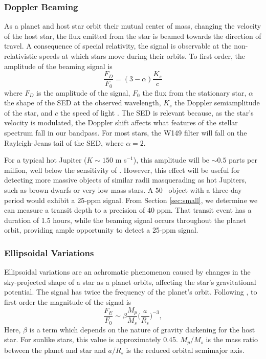 \subsubsection{Doppler Beaming}

As a planet and host star orbit their mutual center of mass, changing the velocity of the
host star, the flux emitted from the star is beamed towards the direction of travel.
A consequence of special relativity, the signal is observable at the non-relativistic
speeds at which stars move during their orbits.
To first order, the amplitude of the beaming signal is 
\begin{equation}
\frac{F_D}{F_0} = (3-\alpha)\frac{K_s}{c}
\end{equation}
where $F_D$ is the amplitude of the signal, $F_0$ the flux from the stationary star,
$\alpha$ the shape of the SED at the observed wavelength, $K_s$ the
Doppler semiamplitude of the star, and $c$ the speed of light \citep{Loeb03}.
The SED is relevant because, as the star's velocity is modulated, the Doppler shift
affects what features of the stellar spectrum fall in our bandpass.
For most stars, the W149 filter will fall on the Rayleigh-Jeans tail of the SED,
where $\alpha = 2$.

For a typical hot Jupiter ($K \sim 150$ m s$^{-1}$), this amplitude will be
$\sim 0.5$ parts per million, well below the sensitivity of \WF. 
However, this effect will be useful for detecting more massive objects of similar radii
masquerading as 
hot Jupiters, such as brown dwarfs or very low mass stars.
A $50$ \mjup\ object with a three-day period would exhibit a 25-ppm signal.
From Section \ref{sec:small}, we determine we can measure a transit depth
to a precision of $40$ ppm. 
That transit event has a duration of 1.5 hours, while the beaming signal occurs
throughout the planet orbit, providing ample opportunity to detect a 25-ppm signal.


\subsubsection{Ellipsoidal Variations}

Ellipsoidal variations are an achromatic phenomenon caused by changes in the sky-projected
shape of a star as a planet orbits, affecting the star's gravitational potential.
The signal has twice the frequency of the planet's orbit. 
Following \citet{Loeb03}, to first order the magnitude of the signal is
\begin{equation}
\frac{F_E}{F_0} \sim \beta \frac{M_p}{M_s} \bigg(\frac{a}{R_s}\bigg)^{-3},
\end{equation}
Here, $\beta$ is a term which depends on the nature of gravity darkening for the host star.
For sunlike stars, this value is approximately 0.45. $M_p/M_s$ is the mass ratio between the planet and star and $a/R_s$ is the reduced orbital semimajor axis.

